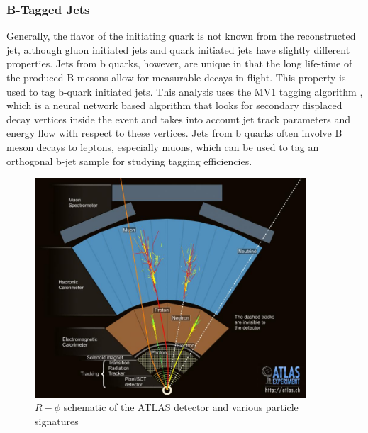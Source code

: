 \subsubsection{B-Tagged Jets}
Generally, the flavor of the initiating quark is not known from the reconstructed jet, although gluon initiated jets and quark initiated jets have slightly different properties. Jets from b quarks, however, are unique in that the long life-time of the produced B mesons allow for measurable decays in flight. This property is used to tag b-quark initiated jets. This analysis uses the MV1 tagging algorithm \cite{ATLAS-CONF-2011-102}, which is a neural network based algorithm that looks for secondary displaced decay vertices inside the event and takes into account jet track parameters and energy flow with respect to these vertices. Jets from b quarks often involve B meson decays to leptons, especially muons, which can be used to tag an orthogonal b-jet sample for studying tagging efficiencies.

\begin{figure}
\centering 
\includegraphics[width=0.9\textwidth]{figs/lhc/particles.jpeg}
\caption{$R-\phi$ schematic of the ATLAS detector and various particle signatures}
\label{figure:lhc_particles}
\end{figure}

